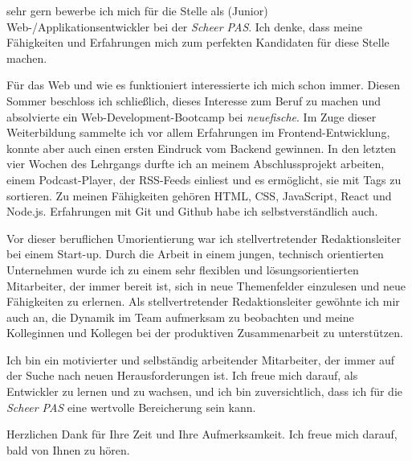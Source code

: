\documentclass[11pt, a4paper]{awesome-cv}
\begin{document}
\makecvheader[R]


\makelettertitle

\begin{cvletter}

sehr gern bewerbe ich mich für die Stelle als (Junior) Web-/Applikationsentwickler bei der \emph{Scheer PAS}. Ich denke, dass meine Fähigkeiten und Erfahrungen mich zum perfekten Kandidaten für diese Stelle machen.

Für das Web und wie es funktioniert interessierte ich mich schon immer. Diesen Sommer beschloss ich schließlich, dieses Interesse zum Beruf zu machen und absolvierte ein Web-Development-Bootcamp bei \emph{neuefische}. Im Zuge dieser Weiterbildung sammelte ich vor allem Erfahrungen im Frontend-Entwicklung, konnte aber auch einen ersten Eindruck vom Backend gewinnen. In den letzten vier Wochen des Lehrgangs durfte ich an meinem Abschlussprojekt arbeiten, einem Podcast-Player, der RSS-Feeds einliest und es ermöglicht, sie mit Tags zu sortieren. Zu meinen Fähigkeiten gehören HTML, CSS, JavaScript, React und Node.js. Erfahrungen mit Git und Github habe ich selbstverständlich auch.

Vor dieser beruflichen Umorientierung war ich stellvertretender Redaktionsleiter bei einem Start-up. Durch die Arbeit in einem jungen, technisch orientierten Unternehmen wurde ich zu einem sehr flexiblen und lösungsorientierten Mitarbeiter, der immer bereit ist, sich in neue Themenfelder einzulesen und neue Fähigkeiten zu erlernen. Als stellvertretender Redaktionsleiter gewöhnte ich mir auch an, die Dynamik im Team aufmerksam zu beobachten und meine Kolleginnen und Kollegen bei der produktiven Zusammenarbeit zu unterstützen.
  
Ich bin ein motivierter und selbständig arbeitender Mitarbeiter, der immer auf der Suche nach neuen Herausforderungen ist. Ich freue mich darauf, als Entwickler zu lernen und zu wachsen, und ich bin zuversichtlich, dass ich für die \emph{Scheer PAS} eine wertvolle Bereicherung sein kann.
  
Herzlichen Dank für Ihre Zeit und Ihre Aufmerksamkeit. Ich freue mich darauf, bald von Ihnen zu hören.


\end{cvletter}


\makeletterclosing
\end{document}

